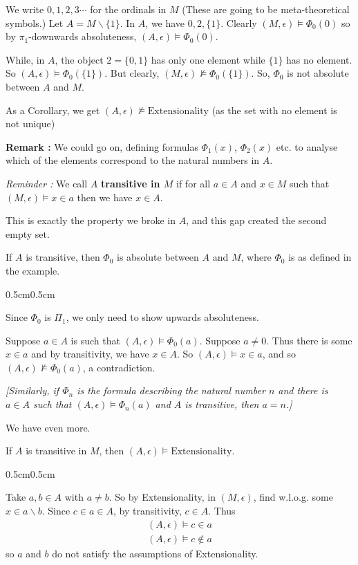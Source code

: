 \documentclass[12pt,a4paper]{article}
\newenvironment{proof}
{\begin{changemargin}{0.5cm}{0.5cm} 
	}%
	{\end{changemargin}
}
\newenvironment{p}
{\begin{proof} 
	}%
	{\end{proof}
}
\begin{document}
\quad We write $0, 1,2,3\cdots$ for the ordinals in $M$ (These are going to be meta-theoretical symbols.) Let $A = M \backslash \{1\}$. In $A$, we have $0,2,\{1\}$. Clearly $(M, \epsilon) \models \Phi_0(0)$ so by $\pi_1$-downwards absoluteness, $(A, \epsilon) \models \Phi_0(0)$.

\quad While, in $A$, the object $2= \{0,1\}$ has only one element while $\{1\}$ has no element. So $(A, \epsilon) \models \Phi_0(\{1\})$. But clearly, $(M, \epsilon) \not\models \Phi_0(\{1\})$. So, $\Phi_0$ is not absolute between $A$ and $M$.

\quad As a Corollary, we get $(A, \epsilon) \not\models \text{Extensionality}$ (as the set with no element is not unique)
\s

\textbf{Remark : } We could go on, defining formulas $\Phi_1(x)$, $\Phi_2(x)$ etc. to analyse which of the elements correspond to the natural numbers in $A$.
\s

\emph{Reminder :} We call $A$ \textbf{transitive in $M$} if for all $a\in A$ and $x\in M$ such that $(M, \epsilon) \models x\in a$ then we have $x\in A$. 

\quad This is exactly the property we broke in $A$, and this gap created the second empty set.
\s

\prop If $A$ is transitive, then $\Phi_0$ is absolute between $A$ and $M$, where $\Phi_0$ is as defined in the example.
\begin{p}
\pf Since $\Phi_0$ is $\Pi_1$, we only need to show upwards absoluteness.

\quad Suppose $a\in A$ is such that $(A, \epsilon) \models \Phi_0(a)$. Suppose $a\neq 0$. Thus there is some $x\in a$ and by transitivity, we have $x\in A$. So $(A, \epsilon) \models x\in a$, and so $(A, \epsilon) \not\models \Phi_0(a)$, a contradiction.

\eop 
\end{p}
\s

\emph{[Similarly, if $\Phi_n$ is the formula describing the natural number $n$ and there is $a\in A$ such that $(A, \epsilon) \models \Phi_n(a)$ and $A$ is transitive, then $a=n$.]}
\s

We have even more.

\prop If $A$ is transitive in $M$, then $(A, \epsilon) \models \text{Extensionality}$.
\begin{p}
\pf Take $a,b\in A$ with $a\neq b$. So by Extensionality, in $(M, \epsilon)$, find w.l.o.g. some $x\in a\backslash b$. Since $c\in a\in A$, by transitivity, $c\in A$. Thus 
\begin{align*}
(A, \epsilon) \models c\in a \\
(A, \epsilon) \models c\not\in a
\end{align*}
so $a$ and $b$ do not satisfy the assumptions of Extensionality.

\eop 
\end{p}
\s
\end{document}
